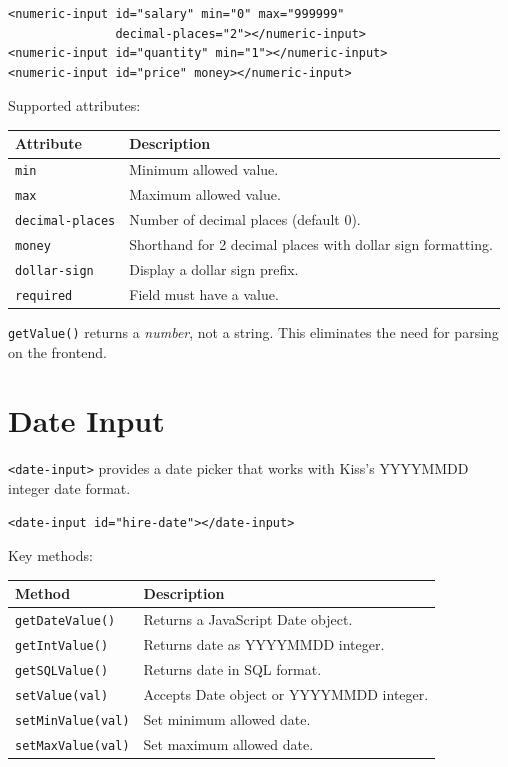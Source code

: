 \begin{lstlisting}[style=html]
<numeric-input id="salary" min="0" max="999999"
               decimal-places="2"></numeric-input>
<numeric-input id="quantity" min="1"></numeric-input>
<numeric-input id="price" money></numeric-input>
\end{lstlisting}

\noindent
Supported attributes:

\begin{longtable}{P{3.8cm}P{6.7cm}}
\toprule
\textbf{Attribute} & \textbf{Description} \\
\midrule
\endhead
\texttt{min} & Minimum allowed value. \\
\texttt{max} & Maximum allowed value. \\
\texttt{decimal-places} & Number of decimal places (default 0). \\
\texttt{money} & Shorthand for 2 decimal places with dollar sign formatting. \\
\texttt{dollar-sign} & Display a dollar sign prefix. \\
\texttt{required} & Field must have a value. \\
\bottomrule
\end{longtable}

\noindent
\texttt{getValue()} returns a \emph{number}, not a string.  This eliminates the need for parsing on the frontend.

\section{Date Input}
\label{sec:comp-date}

\texttt{<date-input>} provides a date picker that works with Kiss's YYYYMMDD integer date format.

\begin{lstlisting}[style=html]
<date-input id="hire-date"></date-input>
\end{lstlisting}

\noindent
Key methods:

\begin{longtable}{P{4.8cm}P{5.7cm}}
\toprule
\textbf{Method} & \textbf{Description} \\
\midrule
\endhead
\texttt{getDateValue()} & Returns a JavaScript Date object. \\
\texttt{getIntValue()} & Returns date as YYYYMMDD integer. \\
\texttt{getSQLValue()} & Returns date in SQL format. \\
\texttt{setValue(val)} & Accepts Date object or YYYYMMDD integer. \\
\texttt{setMinValue(val)} & Set minimum allowed date. \\
\texttt{setMaxValue(val)} & Set maximum allowed date. \\
\bottomrule
\end{longtable}

